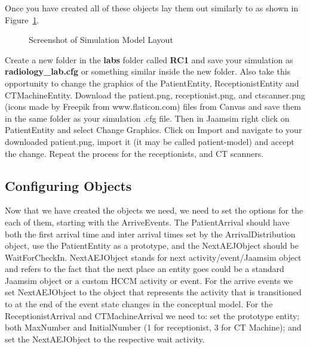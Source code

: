 \documentclass[
  10pt,
  a4paperpaper,
  DIV=11,
  numbers=noendperiod,
  oneside]{scrreprt}
\begin{document}
Once you have created all of these objects lay them out similarly to as
shown in Figure~\ref{fig-sim_pic}.

\begin{figure}[htbp]


\caption{\label{fig-sim_pic}Screenshot of Simulation Model Layout}

\end{figure}%

Create a new folder in the \textbf{labs} folder called \textbf{RC1} and
save your simulation as \textbf{radiology\_lab.cfg} or something similar
inside the new folder. Also take this opportunity to change the graphics
of the PatientEntity, ReceptionistEntity and CTMachineEntity. Download
the patient.png, receptionist.png, and ctscanner.png (icons made by
Freepik from www.flaticon.com) files from Canvas and save them in the
same folder as your simulation .cfg file. Then in Jaamsim right click on
PatientEntity and select Change Graphics. Click on Import and navigate
to your downloaded patient.png, import it (it may be called
patient-model) and accept the change. Repeat the process for the
receptionists, and CT scanners.

\subsection{Configuring Objects}\label{configuring-objects}

Now that we have created the objects we need, we need to set the options
for the each of them, starting with the ArriveEvents. The PatientArrival
should have both the first arrival time and inter arrival times set by
the ArrivalDistribution object, use the PatientEntity as a prototype,
and the NextAEJObject should be WaitForCheckIn. NextAEJObject stands for
next activity/event/Jaamsim object and refers to the fact that the next
place an entity goes could be a standard Jaamsim object or a custom HCCM
activity or event. For the arrive events we set NextAEJObject to the
object that represents the activity that is transitioned to at the end
of the event state changes in the conceptual model. For the
ReceptionistArrival and CTMachineArrival we need to: set the prototype
entity; both MaxNumber and InitialNumber (1 for receptionist, 3 for CT
Machine); and set the NextAEJObject to the respective wait activity.
\end{document}
